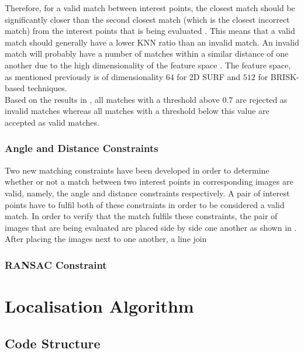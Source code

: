 \documentclass{article}
\begin{document}
Therefore, for a valid match between interest points, the closest match should be significantly closer than the second closest match (which is the closest incorrect match) from the interest points that is being evaluated \cite{Lowe2004}. This means that a valid match should generally have a lower KNN ratio than an invalid match. An invalid match will probably have a number of matches within a similar distance of one another due to the high dimensionality of the feature space \cite{Lowe2004}. The feature space, as mentioned previously is of dimensionality $64$ for 2D SURF and $512$ for BRISK-based techniques.\\

Based on the results in , all matches with a threshold above $0.7$ are rejected as invalid matches whereas all matches with a threshold below this value are accepted as valid matches.\\



\subsubsection{Angle and Distance Constraints}
\label{sec:angleDistanceConstraints}
Two new matching constraints have been developed in order to determine whether or not a match between two interest points in corresponding images are valid, namely, the angle and distance constraints respectively. A pair of interest points have to fulfil both of these constraints in order to be considered a valid match. In order to verify that the match fulfils these constraints, the pair of images that are being evaluated are placed side by side one another as shown in . After placing the images next to one another, a line join

\subsubsection{RANSAC Constraint}
\label{sec:ransacConstraint}




\section{Localisation Algorithm}
\label{sec:localisation}

\subsection{Code Structure}
\label{sec:codeStructure}
\end{document}
